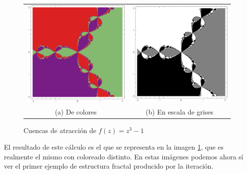 \begin{figure}[h]
    \begin{tabular}{cc}
      \includegraphics[scale=0.5]{./img/cuencas-2.png} &   \includegraphics[scale=0.5]{./img/cuencas-3.png} \\
    (a) De colores & (b) En escala de grises \\[6pt]
    \end{tabular}
    \caption{Cuencas de atracción de $f(z)=z^3-1$}
    \label{fig:cuencas-2}
\end{figure}

El resultado de este cálculo es el que se representa en la imagen \ref{fig:cuencas-2}, que es realmente el mismo con coloreado distinto. En estas imágenes podemos ahora sí ver el primer ejemplo de estructura fractal producido por la iteración.


